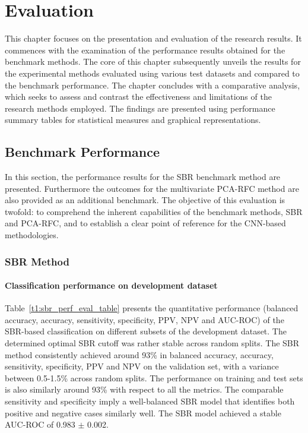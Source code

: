 \section{Evaluation}
\label{sec:evaluation}

This chapter focuses on the presentation and evaluation of the research results.
It commences with the examination of the performance results obtained for the benchmark methods.
The core of this chapter subsequently unveils the results 
for the experimental methods evaluated using various test datasets and compared to the benchmark performance.
The chapter concludes with a comparative analysis, which seeks to assess and contrast the effectiveness and 
limitations of the research methods employed.
The findings are presented using performance summary tables for statistical measures and graphical representations.

\subsection{Benchmark Performance}
\label{subsec:baseline_performance}

In this section, the performance results for the SBR benchmark method are presented. 
Furthermore the outcomes for the multivariate PCA-RFC method are also provided as an additional benchmark.
The objective of this evaluation is twofold: to comprehend the inherent capabilities of the benchmark methods, SBR and
PCA-RFC, and to establish a clear point of reference for the CNN-based methodologies.

\subsubsection{SBR Method}
\label{subsubsec:eval_sbr}



\paragraph{Classification performance on development dataset}

Table~\ref{t1:sbr_perf_eval_table} presents the quantitative performance 
(balanced accuracy, accuracy, sensitivity, specificity, PPV, NPV and AUC-ROC) of the SBR-based classification 
on different subsets of the development dataset.
The determined optimal SBR cutoff was rather stable across random splits.
The SBR method consistently achieved around 93\% in balanced accuracy, accuracy, sensitivity, specificity, PPV and NPV 
on the validation set, with a variance between 0.5-1.5\% across random splits.
The performance on training and test sets is also similarly around 93\% with respect to all the metrics.
The comparable sensitivity and specificity imply a well-balanced SBR model that 
identifies both positive and negative cases similarly well.
The SBR model achieved a stable AUC-ROC of 0.983 $\pm$ 0.002.


